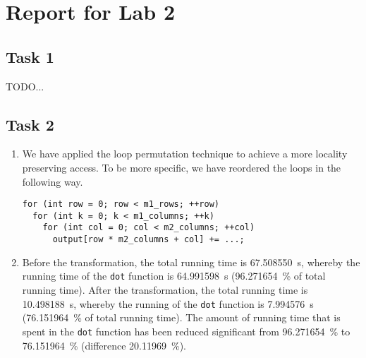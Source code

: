 \documentclass[a4paper, DIV12, headsepline]{scrartcl}
\begin{document}
\section*{Report for Lab 2}
\subsection*{Task 1}
TODO...


\subsection*{Task 2}
\begin{enumerate}[label=\alph*)]
\item We have applied the loop permutation technique to achieve a more locality preserving access. To be more specific, we have reordered the loops in the following way.
\begin{verbatim}
for (int row = 0; row < m1_rows; ++row)
  for (int k = 0; k < m1_columns; ++k)
    for (int col = 0; col < m2_columns; ++col)
      output[row * m2_columns + col] += ...;
\end{verbatim}

\item Before the transformation, the total running time is \SI{67.508550}{s}, whereby the running time of the \texttt{dot} function is \SI{64.991598}{s} (\SI{96.271654}{\%} of total running time). After the transformation, the total running time is \SI{10.498188}{s}, whereby the running of the \texttt{dot} function is \SI{7.994576}{s} (\SI{76.151964}{\%} of total running time). The amount of running time that is spent in the \texttt{dot} function has been reduced significant from \SI{96.271654}{\%} to \SI{76.151964}{\%} (difference \SI{20.11969}{\%}).
\end{enumerate}



\end{document}
